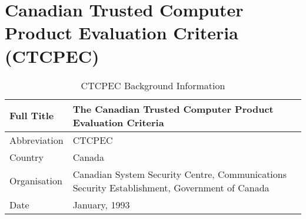 \section{Canadian Trusted Computer Product Evaluation Criteria (CTCPEC)}

        \begin{table}[H]
        \begin{center}
        \begin{tabular}{|>{\sffamily}p{2cm}|>{\sffamily}p{12cm}|} \hline
        Full Title      &   The Canadian Trusted Computer Product Evaluation
                            Criteria \\ \hline
        Abbreviation    &   CTCPEC \\ \hline
        Country         &   Canada \\ \hline
        Organisation    &   Canadian System Security Centre,
                            Communications Security Establishment, 
                            Government of Canada \\ \hline
        Date            &   January, 1993 \\ \hline
        \end{tabular}
        \end{center}
        \caption{CTCPEC Background Information}
        \end{table}
